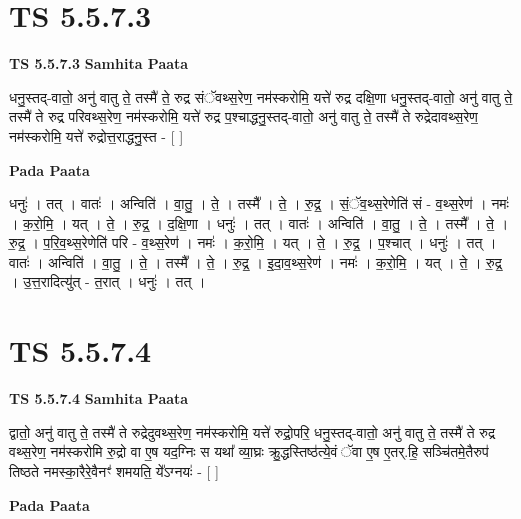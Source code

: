 \documentclass[17pt]{extarticle}
\begin{document}
\section*{ TS 5.5.7.3 }

\textbf{TS 5.5.7.3 } \newline
\textbf{Samhita Paata} \newline

धनु॒स्तद्-वातो॒ अनु॑ वातु ते॒ तस्मै॑ ते॒ रुद्र संॅवथ्स॒रेण॒ नम॑स्करोमि॒ यत्ते॑ रुद्र दक्षि॒णा धनु॒स्तद्-वातो॒ अनु॑ वातु ते॒ तस्मै॑ ते रुद्र परिवथ्स॒रेण॒ नम॑स्करोमि॒ यत्ते॑ रुद्र प॒श्चाद्धनु॒स्तद्-वातो॒ अनु॑ वातु ते॒ तस्मै॑ ते रुद्रेदावथ्स॒रेण॒ नम॑स्करोमि॒ यत्ते॑ रुद्रोत्त॒राद्धनु॒स्त - [  ] \newline

\textbf{Pada Paata} \newline

धनुः॑ । तत् । वातः॑ । अन्विति॑ । वा॒तु॒ । ते॒ । तस्मै᳚ । ते॒ । रु॒द्र॒ । सं॒ॅव॒थ्स॒रेणेति॑ सं - व॒थ्स॒रेण॑ । नमः॑ । क॒रो॒मि॒ । यत् । ते॒ । रु॒द्र॒ । द॒क्षि॒णा । धनुः॑ । तत् । वातः॑ । अन्विति॑ । वा॒तु॒ । ते॒ । तस्मै᳚ । ते॒ । रु॒द्र॒ । प॒रि॒व॒थ्स॒रेणेति॑ परि - व॒थ्स॒रेण॑ । नमः॑ । क॒रो॒मि॒ । यत् । ते॒ । रु॒द्र॒ । प॒श्चात् । धनुः॑ । तत् । वातः॑ । अन्विति॑ । वा॒तु॒ । ते॒ । तस्मै᳚ । ते॒ । रु॒द्र॒ । इ॒दा॒व॒थ्स॒रेण॑ । नमः॑ । क॒रो॒मि॒ । यत् । ते॒ । रु॒द्र॒ । उ॒त्त॒रादित्यु॑त् - त॒रात् । धनुः॑ । तत् ।  \newline




\section*{ TS 5.5.7.4 }

\textbf{TS 5.5.7.4 } \newline
\textbf{Samhita Paata} \newline

द्वातो॒ अनु॑ वातु ते॒ तस्मै॑ ते रुद्रेदुवथ्स॒रेण॒ नम॑स्करोमि॒ यत्ते॑ रुद्रो॒परि॒ धनु॒स्तद्-वातो॒ अनु॑ वातु ते॒ तस्मै॑ ते रुद्र वथ्स॒रेण॒ नम॑स्करोमि रु॒द्रो वा ए॒ष यद॒ग्निः स यथा᳚ व्या॒घ्रः क्रु॒द्धस्तिष्ठ॑त्ये॒वं ॅवा ए॒ष ए॒तर्.हि॒ सञ्चि॑तमे॒तैरुप॑ तिष्ठते नमस्का॒रैरे॒वैनꣳ॑ शमयति॒ ये᳚ऽग्नयः॑ - [  ] \newline

\textbf{Pada Paata} \newline
\end{document}
